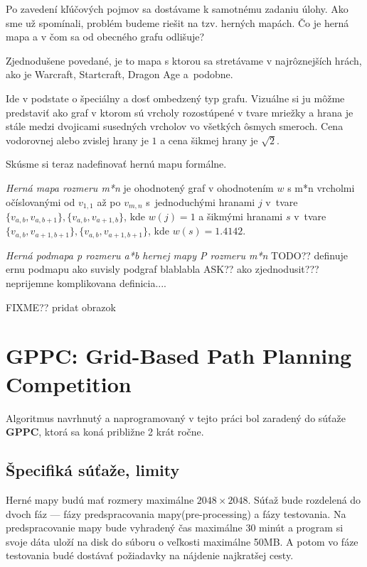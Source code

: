Po zavedení kľúčových pojmov sa dostávame k samotnému zadaniu úlohy. 
Ako sme už spomínali, problém budeme riešit na tzv. herných mapách. Čo je herná mapa a v čom sa od obecného grafu odlišuje?

Zjednodušene povedané, je to mapa s ktorou sa stretávame v najrôznejších hrách, ako je Warcraft, Startcraft, Dragon Age
a~podobne.

Ide v podstate o špeciálny a dosť ombedzený typ grafu. Vizuálne si ju môžme predstaviť ako graf v ktorom sú vrcholy rozostúpené v tvare mriežky a hrana
je stále medzi dvojicami susedných vrcholov vo všetkých ôsmych smeroch. Cena vodorovnej alebo zvislej hrany je $1$ a cena šikmej hrany je $\sqrt{2}$.


Skúsme si teraz nadefinovať hernú mapu formálne.

\begin{define}
{\sl Herná mapa rozmeru m*n} je ohodnotený graf v ohodnotením $w$ s m*n vrcholmi očíslovanými od $v_{1,1}$ až po $v_{m,n}$ 
s~jednoduchými hranami $j$ v~tvare $\{v_{a,b}, v_{a,b+1}\}, \{v_{a,b}, v_{a+1,b}\}$, kde $w(j) = 1$ 
a šikmými hranami $ s $ v~tvare $\{v_{a,b}, v_{a+1,b+1}\}, \{v_{a,b}, v_{a+1,b+1}\}$, kde $ w(s) = 1.4142 $.
\end{define}

\begin{define}
{\sl Herná podmapa p rozmeru a*b hernej mapy P rozmeru m*n} 
TODO?? definuje ernu podmapu ako suvisly podgraf blablabla ASK?? ako zjednodusit??? neprijemne komplikovana definicia....

\end{define}
FIXME?? pridat obrazok


\section{GPPC: Grid-Based Path Planning Competition}
Algoritmus navrhnutý a naprogramovaný v tejto práci bol zaradený do súťaže \textbf{GPPC}, ktorá sa koná približne 2 krát ročne.

\subsection{Špecifiká súťaže, limity}

Herné mapy budú mať rozmery maximálne $2048 \times 2048$.
Súťaž bude rozdelená do dvoch fáz --- fázy predspracovania mapy(pre-processing)
a fázy testovania. Na predspracovanie mapy bude vyhradený čas
maximálne 30 minút a program si svoje dáta uloží na disk do súboru o veľkosti maximálne 50MB.
A potom vo fáze testovania budé dostávať požiadavky na nájdenie najkratšej cesty.

